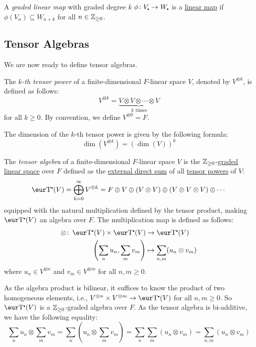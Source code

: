 \begin{definition}\label{def:graded_linear_map}
	A \emph{graded linear map} with graded degree $k$ $\phi \colon V_{\smallbullet} \to W_{\smallbullet}$ is a \hyperref[def:linear_map]{linear map} if $\phi(V_n) \subseteq W_{n+k}$ for all $n \in \operatorname{\mathbb{Z}}_{\geq 0}$.
\end{definition}

\subsection{Tensor Algebras}
We are now ready to define tensor algebras.

\begin{definition}\label{def:tensor_power}
	The \emph{$k$-th tensor power} of a finite-dimensional $F$-linear space $V$, denoted by $V^{\otimes k}$, is defined as follows:
	\[
		V^{\otimes k} = \underbrace{V \otimes V \otimes \cdots \otimes V}_{k \text{ times}}
	\]
	for all $k \geq 0$. By convention, we define $V^{\otimes 0} = F$.
\end{definition}

The dimension of the $k$-th tensor power is given by the following formula:
\[ \dim(V^{\otimes k}) = {(\dim(V))}^k \]

\begin{definition}\label{def:tensor_algebra}
	The \emph{tensor algebra} of a finite-dimensional $F$-linear space $V$ is the $\operatorname{\mathbb{Z}}_{\geq 0}$-\hyperref[def:graded_linear_space]{graded linear space} over $F$ defined as the \hyperref[def:external_direct_sum]{external direct sum} of all \hyperref[def:tensor_power]{tensor powers} of $V$:
	\[
		\T(V) = \bigoplus_{k = 0}^{\infty} V^{\otimes k} = F \oplus V \oplus (V \otimes V) \oplus (V \otimes V \otimes V) \oplus \cdots
	\]
	equipped with the natural multiplication defined by the tensor product, making $\T(V)$ an algebra over $F$. The multiplication map is defined as follows:
	\begin{align*}
		\otimes \colon \T(V) \times \T(V)     & \to \T(V)                             \\
		\left( \sum_n u_n, \sum_m v_m \right) & \mapsto \sum_{n, m} (u_n \otimes v_m)
	\end{align*}
	where $u_n \in V^{\otimes n}$ and $v_m \in V^{\otimes m}$ for all $n, m \geq 0$.
\end{definition}

\begin{remark}
	As the algebra product is bilinear, it suffices to know the product of two homogeneous elements, i.e., $V^{\otimes n} \times V^{\otimes m} \to \T(V)$ for all $n, m \geq 0$. So $\T(V)$ is a $\operatorname{\mathbb{Z}}_{\geq 0}$-graded algebra over $F$. As the tensor algebra is bi-additive, we have the following equality:
	\[
		\sum_n u_n \otimes \sum_m v_m = \sum_n (u_n \otimes \sum_m v_m) = \sum_n \sum_m (u_n \otimes v_m) = \sum_{n, m} (u_n \otimes v_m)
	\]
\end{remark}

